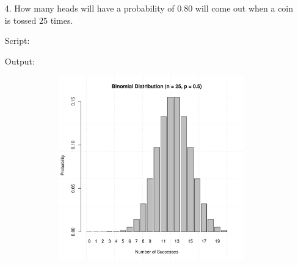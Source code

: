 \documentclass[a4paper,11pt,openright]{report}
\begin{document}
\begin{enumerate}
\item[4.] How many heads will have a probability of $0.80$ will come out when a coin is
tossed $25$ times.

Script:


Output:


\begin{figure}[ht!]
\includegraphics[width=16cm,height=8cm,keepaspectratio]{plot4.pdf}
\centering
\end{figure}

\end{enumerate}
\end{document}
